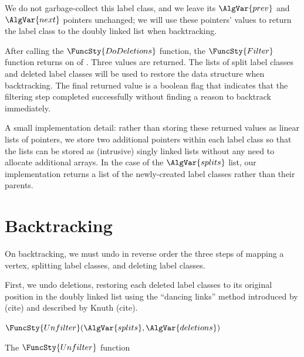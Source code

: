We do not garbage-collect this label class, and
we leave its $\AlgVar{prev}$ and $\AlgVar{next}$ 
pointers unchanged; we will use these pointers' values to return
the label class to the doubly linked list when backtracking.

After calling the $\FuncSty{DoDeletions}$ function,
the $\FuncSty{Filter}$ function returns on  
of .  Three values are returned. The lists
of split label classes and deleted label classes will be used to restore
the data structure when backtracking. The final returned value is a boolean
flag that indicates that the filtering step completed successfully
without finding a reason to backtrack immediately.

A small implementation detail: rather than storing these returned values
as linear lists of pointers, we store two additional pointers within
each label class so that the lists can be stored as (intrusive) singly linked
lists without any need to allocate additional arrays.  In the case of the
$\AlgVar{splits}$ list, our implementation returns a list of the newly-created
label classes rather than their parents.

\section{Backtracking}

On backtracking, we must undo in reverse order the three steps of
mapping a vertex, splitting label classes, and deleting label classes.

First, we undo deletions, restoring each deleted label classes to its
original position in the doubly linked list using the ``dancing links'' method
introduced by (cite) and described by Knuth (cite).

\begin{algorithm}[htb]
\AlgorithmFontSize
\DontPrintSemicolon
\nl $\FuncSty{Unfilter}(\AlgVar{splits}, \AlgVar{deletions})$ \;
\nl {}
\caption{The $\FuncSty{Unfilter}$ function}
\label{McSplitSIAlgUnfilter}
\end{algorithm}

